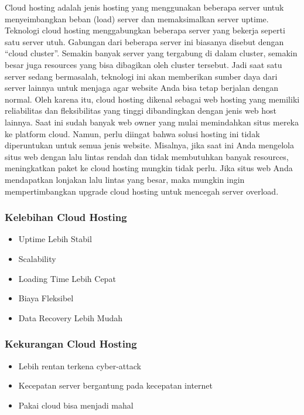 \documentclass[conference]{IEEEtran}
\begin{document}
    Cloud hosting adalah jenis hosting yang menggunakan beberapa server untuk menyeimbangkan beban (load) server dan memaksimalkan server uptime.
    Teknologi cloud hosting menggabungkan beberapa server yang bekerja seperti satu server utuh. Gabungan dari beberapa server ini biasanya disebut dengan “cloud cluster”.
    Semakin banyak server yang tergabung di dalam cluster, semakin besar juga resources yang bisa dibagikan oleh cluster tersebut. 
    Jadi saat satu server sedang bermasalah, teknologi ini akan memberikan sumber daya dari server lainnya untuk menjaga agar website Anda bisa tetap berjalan dengan normal.
    Oleh karena itu, cloud hosting dikenal sebagai web hosting yang memiliki reliabilitas dan fleksibilitas yang tinggi dibandingkan dengan jenis web host lainnya.
    Saat ini sudah banyak web owner yang mulai memindahkan situs mereka ke platform cloud. Namun, perlu diingat bahwa solusi hosting ini tidak diperuntukan untuk semua jenis website.
    Misalnya, jika saat ini Anda mengelola situs web dengan lalu lintas rendah dan tidak membutuhkan banyak resources, meningkatkan paket ke cloud hosting mungkin tidak perlu.
    Jika situs web Anda mendapatkan lonjakan lalu lintas yang besar, maka mungkin ingin mempertimbangkan upgrade cloud hosting untuk mencegah server overload.
    \vspace{0.2cm}
    \subsubsection{Kelebihan Cloud Hosting}
     
    \begin{itemize}
        \item Uptime Lebih Stabil
        \item Scalability
        \item Loading Time Lebih Cepat
        \item Biaya Fleksibel
        \item Data Recovery Lebih Mudah
      \end{itemize}
      \vspace{0.2cm}
      \subsubsection{Kekurangan Cloud Hosting}
      \begin{itemize}
        \item Lebih rentan terkena cyber-attack
        \item Kecepatan server bergantung pada kecepatan internet
        \item Pakai cloud bisa menjadi mahal
      \end{itemize}
    
\end{document}
